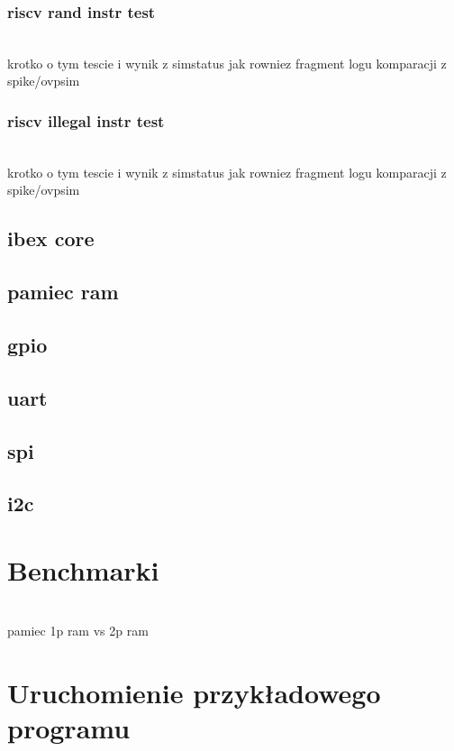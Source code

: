 \documentclass[11pt,a4paper]{article}
\begin{document}
		\subsubsection{riscv rand instr test}
		\hspace{5mm}
			\\krotko o tym tescie i wynik z simstatus jak rowniez fragment logu komparacji z spike/ovpsim
			
		\subsubsection{riscv illegal instr test}
		\hspace{5mm}
			\\krotko o tym tescie i wynik z simstatus jak rowniez fragment logu komparacji z spike/ovpsim

\subsection{ibex core}

\subsection{pamiec ram}

\subsection{gpio}

\subsection{uart}

\subsection{spi}

\subsection{i2c}

\newpage
\section{Benchmarki}
\hspace{5mm}
	\\ pamiec 1p ram vs 2p ram

\newpage
\section{Uruchomienie przykładowego programu}
\newpage
\end{document}
